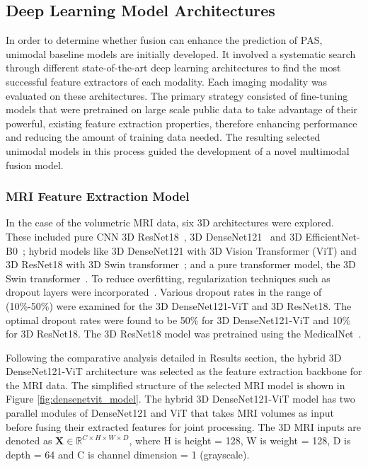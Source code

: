 \documentclass[12pt]{article}
\begin{document}
\subsection{Deep Learning Model Architectures}

In order to determine whether fusion can enhance the prediction of PAS, unimodal baseline models are initially developed. It involved a systematic search through different state-of-the-art deep learning architectures to find the most successful feature extractors of each modality. Each imaging modality was evaluated on these architectures. The primary strategy consisted of fine-tuning models that were pretrained on large scale public data to take advantage of their powerful, existing feature extraction properties, therefore enhancing performance and reducing the amount of training data needed. The resulting selected unimodal models in this process guided the development of a novel multimodal fusion model.

\subsubsection{MRI Feature Extraction Model}

In the case of the volumetric MRI data, six 3D architectures were explored. These included pure CNN 3D ResNet18~\cite{He_2016}, 3D DenseNet121~\cite{Huang_2017} and 3D EfficientNet-B0~\cite{tan_2019}; hybrid models like 3D DenseNet121 with 3D Vision Transformer (ViT) and 3D ResNet18 with 3D Swin transformer~\cite{Ahmed_2025}; and a pure transformer model, the 3D Swin transformer~\cite{liu2021swin}. To reduce overfitting, regularization techniques such as dropout layers were incorporated~\cite{Ali_2025}. Various dropout rates in the range of (10\%-50\%) were examined for the 3D DenseNet121-ViT and 3D ResNet18. The optimal dropout rates were found to be 50\% for 3D DenseNet121-ViT and 10\% for 3D ResNet18. The 3D ResNet18 model was pretrained using the MedicalNet~\cite{chen_2019, Ali_2025}.

Following the comparative analysis detailed in Results section, the hybrid 3D DenseNet121-ViT architecture was selected as the feature extraction backbone for the MRI data. The simplified structure of the selected MRI model is shown in Figure \ref{fig:densenetvit_model}. The hybrid 3D DenseNet121-ViT model has two parallel modules of DenseNet121 and ViT that takes MRI volumes as input before fusing their extracted features for joint processing. The 3D MRI inputs are denoted as $\mathbf{X} \in \mathbb{R}^{C \times H \times W \times D}$, where H is height = 128, W is weight = 128, D is depth = 64 and C is channel dimension = 1 (grayscale).
\end{document}

